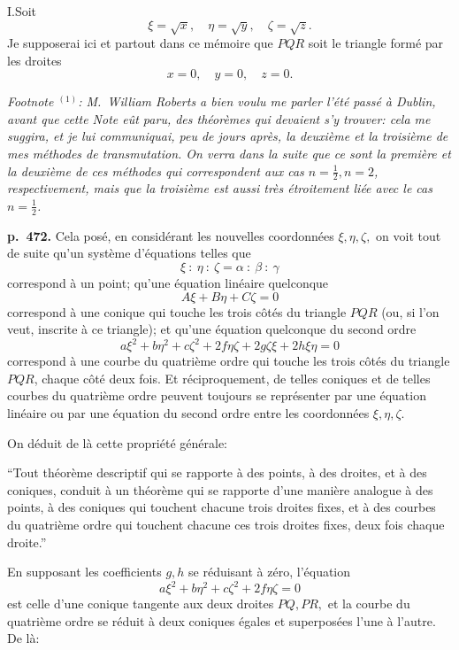 \documentclass[11pt]{article}
\begin{document}
\medskip
I.\quad Soit
\[ \xi = \sqrt{x},\quad \eta = \sqrt{y},\quad \zeta = \sqrt{z}. \]
Je supposerai ici et partout dans ce m\'emoire que $PQR$ soit le triangle form\'e par les droites
\[ x = 0,\quad y = 0,\quad z = 0. \]

\noindent\textit{Footnote $^{(1)}$: M.\ William Roberts a bien voulu me parler l'\'et\'e pass\'e \`a Dublin, avant que cette Note e\^ut paru, des th\'eor\`emes qui devaient s'y trouver: cela me suggira, et je lui communiquai, peu de jours apr\`es, la deuxi\`eme et la troisi\`eme de mes m\'ethodes de transmutation. On verra dans la suite que ce sont la premi\`ere et la deuxi\`eme de ces m\'ethodes qui correspondent aux cas $n = \tfrac{1}{2}, n = 2$, respectivement, mais que la troisi\`eme est aussi tr\`es \'etroitement li\'ee avec le cas $n = \tfrac{1}{2}$.}

\bigskip
\noindent\textbf{p.~472.} Cela pos\'e, en consid\'erant les nouvelles coordonn\'ees $\xi, \eta, \zeta,$ on voit tout de suite qu'un syst\`eme d'\'equations telles que
\[ \xi\ :\ \eta\ :\ \zeta = \alpha\ :\ \beta\ :\ \gamma \]
correspond \`a un point; qu'une \'equation lin\'eaire quelconque
\[ A\xi + B\eta + C\zeta = 0 \]
correspond \`a une conique qui touche les trois c\^ot\'es du triangle $PQR$ (ou, si l'on veut, inscrite \`a ce triangle); et qu'une \'equation quelconque du second ordre
\[ a\xi^2 + b\eta^2 + c\zeta^2 + 2f\eta\zeta + 2g\zeta\xi + 2h\xi\eta = 0 \]
correspond \`a une courbe du quatri\`eme ordre qui touche les trois c\^ot\'es du triangle $PQR$, chaque c\^ot\'e deux fois. Et r\'eciproquement, de telles coniques et de telles courbes du quatri\`eme ordre peuvent toujours se repr\'esenter par une \'equation lin\'eaire ou par une \'equation du second ordre entre les coordonn\'ees $\xi, \eta, \zeta$.

On d\'eduit de l\`a cette propri\'et\'e g\'en\'erale:

``Tout th\'eor\`eme descriptif qui se rapporte \`a des points, \`a des droites, et \`a des coniques, conduit \`a un th\'eor\`eme qui se rapporte d'une mani\`ere analogue \`a des points, \`a des coniques qui touchent chacune trois droites fixes, et \`a des courbes du quatri\`eme ordre qui touchent chacune ces trois droites fixes, deux fois chaque droite.''

En supposant les coefficients $g, h$ se r\'eduisant \`a z\'ero, l'\'equation
\[ a\xi^2 + b\eta^2 + c\zeta^2 + 2f\eta\zeta = 0 \]
est celle d'une conique tangente aux deux droites $PQ, PR,$ et la courbe du quatri\`eme ordre se r\'eduit \`a deux coniques \'egales et superpos\'ees l'une \`a l'autre. De l\`a:
\end{document}
